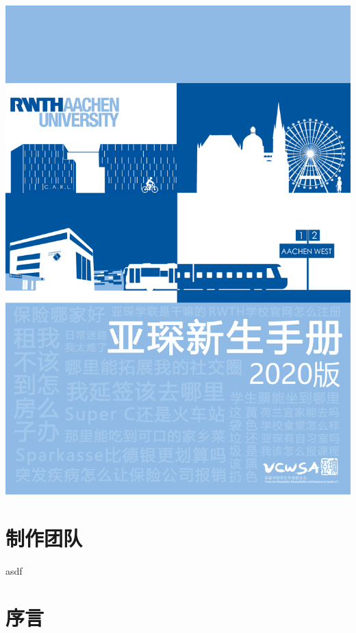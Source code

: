 \documentclass[a4paper,10pt,openany]{scrbook}
\begin{document}
\frontmatter

\begin{titlepage}
\parindent=0pt
\includegraphics[width=\linewidth]{Bilder/Front_Cover_.png}
\end{titlepage}

\chapter*{制作团队}

asdf

\newpage

\chapter*{序言}
\end{document}
